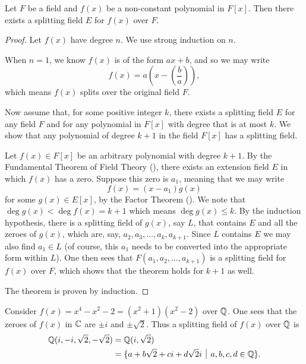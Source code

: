 \begin{theorem}
    Let $F$ be a field and $f(x)$ be a non-constant polynomial in $F[x]$. Then there exists a splitting field $E$ for $f(x)$ over $F$.
\end{theorem}
\begin{proof}
    Let $f(x)$ have degree $n$. We use strong induction on $n$.

    When $n = 1$, we know $f(x)$ is of the form $ax + b$, and so we may write
    \[
        f(x) = a\left(x - \left(\frac ba\right)\right),
    \]
    which means $f(x)$ splits over the original field $F$.

    Now assume that, for some positive integer $k$, there exists a splitting field $E$ for any field $F$ and for any polynomial in $F[x]$ with degree that is at most $k$. We show that any polynomial of degree $k + 1$ in the field $F[x]$ has a splitting field.

    Let $f(x) \in F[x]$ be an arbitrary polynomial with degree $k + 1$. By the Fundamental Theorem of Field Theory (), there exists an extension field $E$ in which $f(x)$ has a zero. Suppose this zero is $a_1$, meaning that we may write
    \[
        f(x) = (x - a_1)g(x)
    \]
    for some $g(x) \in E[x]$, by the Factor Theorem (). We note that $\deg g(x) < \deg f(x) = k + 1$ which means $\deg g(x) \leq k$. By the induction hypothesis, there is a splitting field of $g(x)$, say $L$, that contains $E$ and all the zeroes of $g(x)$, which are, say, $a_2, a_3, \dots, a_k, a_{k+1}$. Since $L$ contains $E$ we may also find $a_1 \in L$ (of course, this $a_1$ needs to be converted into the appropriate form within $L$). One then sees that $F(a_1, a_2, \dots, a_{k+1})$ is a splitting field for $f(x)$ over $F$, which shows that the theorem holds for $k + 1$ as well.

    The theorem is proven by induction.
\end{proof}

\begin{example}
    Consider $f(x) = x^4 - x^2 - 2 = (x^2+1)(x^2 - 2)$ over $\mathbb{Q}$. One sees that the zeroes of $f(x)$ in $\mathbb{C}$ are $\pm i$ and $\pm\sqrt2$. Thus a splitting field of $f(x)$ over $\mathbb{Q}$ is
    \begin{align*}
        \Q(i, -i, \sqrt2, -\sqrt2) &= \Q(i, \sqrt2)\\
        &= \{a + b\sqrt2 + ci + d\sqrt2i \vert a, b, c, d \in \Q\}.
    \end{align*}
\end{example}

